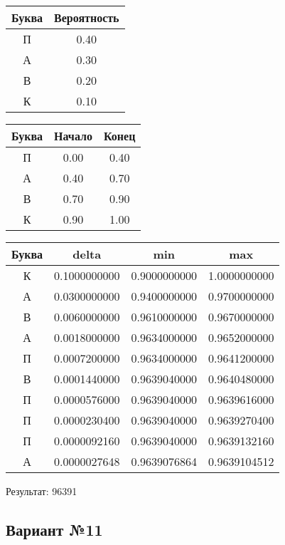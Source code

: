 \documentclass[a4paper, 12pt]{article}
\begin{document}
\begin{center}
 \begin{tabular}{ |c|c| } 
  \hline
     Буква & Вероятность \\ \hline
П & 0.40\\\hline
А & 0.30\\\hline
В & 0.20\\\hline
К & 0.10
\\ \hline \end{tabular}
\end{center}
\begin{center}
 \begin{tabular}{ |c|c|c| } 
  \hline
     Буква & Начало & Конец \\ \hline
П & 0.00 & 0.40\\\hline
А & 0.40 & 0.70\\\hline
В & 0.70 & 0.90\\\hline
К & 0.90 & 1.00
\\ \hline \end{tabular}
\end{center}
\begin{center}
 \begin{tabular}{ |c|c|c|c| } 
  \hline
     Буква & delta & min & max \\ \hline
К & 0.1000000000 & 0.9000000000 & 1.0000000000\\\hline
А & 0.0300000000 & 0.9400000000 & 0.9700000000\\\hline
В & 0.0060000000 & 0.9610000000 & 0.9670000000\\\hline
А & 0.0018000000 & 0.9634000000 & 0.9652000000\\\hline
П & 0.0007200000 & 0.9634000000 & 0.9641200000\\\hline
В & 0.0001440000 & 0.9639040000 & 0.9640480000\\\hline
П & 0.0000576000 & 0.9639040000 & 0.9639616000\\\hline
П & 0.0000230400 & 0.9639040000 & 0.9639270400\\\hline
П & 0.0000092160 & 0.9639040000 & 0.9639132160\\\hline
А & 0.0000027648 & 0.9639076864 & 0.9639104512
\\ \hline \end{tabular}
\end{center}
Результат: 96391
\pagebreak
\subsection{Вариант №11}
\end{document}
